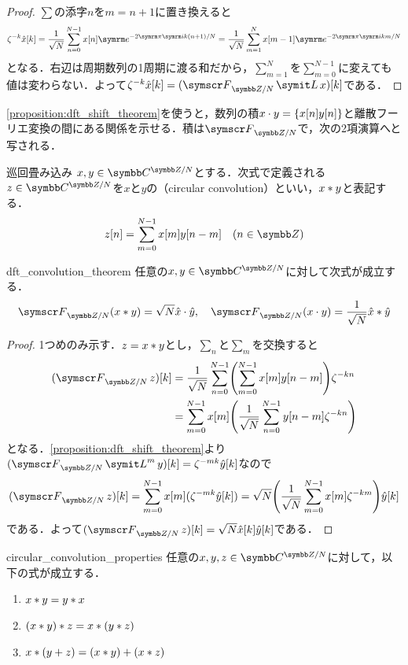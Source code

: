 \documentclass[../../main]{subfiles}
\begin{document}
\begin{proof}
  \(\sum\)の添字\(n\)を\(m=n+1\)に置き換えると
  \[
    \zeta^{-k}\hat{x}[k] = \frac{1}{\sqrt{N}}\sum_{n=0}^{N-1}x[n]\napr^{-2\krez\iuni k(n+1)/N}
    = \frac{1}{\sqrt{N}}\sum_{m=1}^Nx[m-1]\napr^{-2\krez\iuni km/N}
  \]
  となる．右辺は周期数列の1周期に渡る和だから，\(\sum_{m=1}^N\)を\(\sum_{m=0}^{N-1}\)に変えても値は変わらない．よって\(\zeta^{-k}\hat{x}[k]=(\dft{N}\lagop x)[k]\)である．
\end{proof}

\cref{proposition:dft_shift_theorem}を使うと，数列の積\(x\cdot y=\lbrace x[n]y[n]\rbrace\)と離散フーリエ変換の間にある関係を示せる．積は\(\dft{N}\)で，次の2項演算へと写される．

\begin{definition}{巡回畳み込み}{}
  \(x,y\in\cycles{\numset{C}}{N}\)とする．次式で定義される\(z\in\cycles{\numset{C}}{N}\)を\(x\)と\(y\)の（circular convolution）といい，\(x\ast y\)と表記する．
  \[
    z[n] = \sum_{m=0}^{N-1}x[m]y[n-m]\quad(n\in\numset{Z})
  \]
\end{definition}

\begin{proposition}{}{dft_convolution_theorem}
  任意の\(x,y\in\cycles{\numset{C}}{N}\)に対して次式が成立する．
  \[
    \dft{N}(x\circconv y) = \sqrt{N}\hat{x}\cdot\hat{y},
    \quad\dft{N}(x\cdot y) = \frac{1}{\sqrt{N}}\hat{x}\circconv\hat{y}
  \]
\end{proposition}

\begin{proof}
  1つめのみ示す．\(z=x\ast y\)とし，\(\sum_n\)と\(\sum_m\)を交換すると
  \begin{align*}
    (\dft{N}z)[k] &= \frac{1}{\sqrt{N}}\sum_{n=0}^{N-1}\pqty*{\sum_{m=0}^{N-1}x[m]y[n-m]}\zeta^{-kn} \\
    &= \sum_{m=0}^{N-1}x[m]\pqty*{\frac{1}{\sqrt{N}}\sum_{n=0}^{N-1}y[n-m]\zeta^{-kn}}
  \end{align*}
  となる．\cref{proposition:dft_shift_theorem}より\((\dft{N}\lagop^my)[k]=\zeta^{-mk}\hat{y}[k]\)なので
  \[
    (\dft{N}z)[k] = \sum_{m=0}^{N-1}x[m](\zeta^{-mk}\hat{y}[k])
    = \sqrt{N}\pqty*{\frac{1}{\sqrt{N}}\sum_{m=0}^{N-1}x[m]\zeta^{-km}}\hat{y}[k]
  \]
  である．よって\((\dft{N}z)[k]=\sqrt{N}\hat{x}[k]\hat{y}[k]\)である．
\end{proof}

\begin{corollary}{}{circular_convolution_properties}
  任意の\(x,y,z\in\cycles{\numset{C}}{N}\)に対して，以下の式が成立する．
  \begin{enumerate}
    \item \(x\ast y=y\ast x\)
    \item \((x\ast y)\ast z=x\ast (y\ast z)\)
    \item \(x\ast(y+z)=(x\ast y)+(x\ast z)\)
  \end{enumerate}
\end{corollary}
\end{document}
